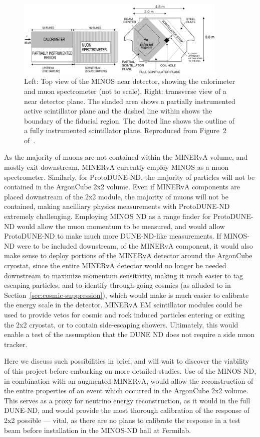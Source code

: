 \begin{figure}[htb]
	\centering
	\includegraphics[width=0.9\textwidth]{plots/minos.png}
	\caption{Left: Top view of the MINOS near detector, showing the calorimeter and muon spectrometer (not to scale). Right: transverse view of a near detector plane. The shaded area shows a partially instrumented active scintillator plane and the dashed line within shows the boundary of the fiducial region. The dotted line shows the outline of a fully instrumented scintillator plane. Reproduced from Figure~2 of~\cite{MINOSDetectors}.}
	\label{fig:minos_near_detector}
\end{figure}

As the majority of muons are not contained within the MINERvA volume, and mostly exit downstream, MINERvA currently employ MINOS as a muon spectrometer. Similarly, for ProtoDUNE-ND, the majority of particles will not be contained in the ArgonCube 2x2 volume. Even if MINERvA components are placed downstream of the 2x2 module, the majority of muons will not be contained, making ancilliary physics measurements with ProtoDUNE-ND extremely challenging. Employing MINOS ND as a range finder for ProtoDUNE-ND would allow the muon momentum to be measured, and would allow ProtoDUNE-ND to make much more DUNE-ND-like measurements. If MINOS-ND were to be included downstream, of the MINERvA component, it would also make sense to deploy portions of the MINERvA detector around the ArgonCube cryostat, since the entire MINERvA detector would no longer be needed downstream to maximize momentum sensitivity, making it much easier to tag escaping particles, and to identify through-going cosmics (as alluded to in Section~\ref{sec:cosmic-suppression}), which would make is much easier to calibrate the energy scale in the detector. MINERvA EM scintillator modules could be used to provide vetos for cosmic and rock induced particles entering or exiting the 2x2 cryostat, or to contain side-escaping showers. Ultimately, this would enable a test of the assumption that the DUNE ND does not require a side muon tracker.

Here we discuss such possibilities in brief, and will wait to discover the viability of this project before embarking on more detailed studies. Use of the MINOS ND, in combination with an augmented MINERvA, would allow the reconstruction of the entire properties of an event which occurred in the ArgonCube 2x2 volume. This serves as a proxy for neutrino energy reconstruction, as it would in the full DUNE-ND, and would provide the most thorough calibration of the response of 2x2 possible --- vital, as there are no plans to calibrate the response in a test beam before installation in the MINOS-ND hall at Fermilab.

